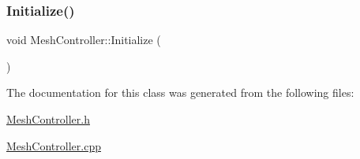 \subsubsection{\texorpdfstring{Initialize()}{Initialize()}}
{\footnotesize\ttfamily void Mesh\+Controller\+::\+Initialize (\begin{DoxyParamCaption}{ }\end{DoxyParamCaption})}



The documentation for this class was generated from the following files\+:\begin{DoxyCompactItemize}
\item 
\mbox{\hyperlink{_mesh_controller_8h}{Mesh\+Controller.\+h}}\item 
\mbox{\hyperlink{_mesh_controller_8cpp}{Mesh\+Controller.\+cpp}}\end{DoxyCompactItemize}
